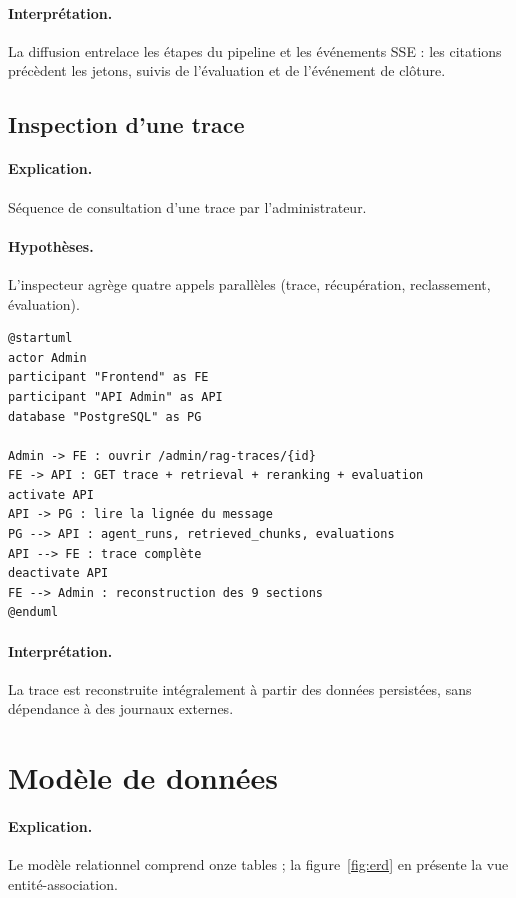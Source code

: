 \paragraph{Interprétation.} La diffusion entrelace les étapes du pipeline et les
événements SSE : les citations précèdent les jetons, suivis de l'évaluation et de
l'événement de clôture.

\subsection{Inspection d'une trace}
\paragraph{Explication.} Séquence de consultation d'une trace par
l'administrateur.
\paragraph{Hypothèses.} L'inspecteur agrège quatre appels parallèles (trace,
récupération, reclassement, évaluation).

\begin{lstlisting}[style=plantuml,caption={Séquence — inspection de trace},label={lst:seq-trace}]
@startuml
actor Admin
participant "Frontend" as FE
participant "API Admin" as API
database "PostgreSQL" as PG

Admin -> FE : ouvrir /admin/rag-traces/{id}
FE -> API : GET trace + retrieval + reranking + evaluation
activate API
API -> PG : lire la lignée du message
PG --> API : agent_runs, retrieved_chunks, evaluations
API --> FE : trace complète
deactivate API
FE --> Admin : reconstruction des 9 sections
@enduml
\end{lstlisting}

\paragraph{Interprétation.} La trace est reconstruite intégralement à partir des
données persistées, sans dépendance à des journaux externes.

\section{Modèle de données}
\paragraph{Explication.} Le modèle relationnel comprend onze tables ; la
figure~\ref{fig:erd} en présente la vue entité-association.
